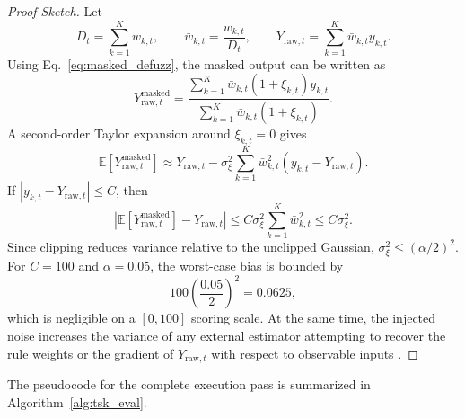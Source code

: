 \documentclass[pdflatex,sn-mathphys-num]{sn-jnl}
\theoremstyle{thmstyleone}
\theoremstyle{thmstyletwo}
\theoremstyle{thmstylethree}
\begin{document}
\begin{proof}[Proof Sketch]
Let
\[
    D_t = \sum_{k=1}^{K} w_{k,t},
    \qquad
    \bar{w}_{k,t} = \frac{w_{k,t}}{D_t},
    \qquad
    Y_{\mathrm{raw},t} = \sum_{k=1}^{K} \bar{w}_{k,t} y_{k,t}.
\]
Using Eq.~\eqref{eq:masked_defuzz}, the masked output can be written as
\[
    Y_{\mathrm{raw},t}^{\text{masked}}
    =
    \frac{
    \sum_{k=1}^{K} \bar{w}_{k,t} (1+\xi_{k,t}) y_{k,t}
    }{
    \sum_{k=1}^{K} \bar{w}_{k,t} (1+\xi_{k,t})
    }.
\]
A second-order Taylor expansion around $\xi_{k,t}=0$ gives
\begin{equation}
    \mathbb{E}\left[
    Y_{\mathrm{raw},t}^{\text{masked}}
    \right]
    \approx
    Y_{\mathrm{raw},t}
    -
    \sigma_{\xi}^2
    \sum_{k=1}^{K}
    \bar{w}_{k,t}^2
    \left(
    y_{k,t} - Y_{\mathrm{raw},t}
    \right).
    \label{eq:bias_expansion}
\end{equation}
If $|y_{k,t} - Y_{\mathrm{raw},t}| \le C$, then
\[
    \left|
    \mathbb{E}\left[
    Y_{\mathrm{raw},t}^{\text{masked}}
    \right]
    -
    Y_{\mathrm{raw},t}
    \right|
    \le
    C \sigma_{\xi}^2
    \sum_{k=1}^{K}
    \bar{w}_{k,t}^2
    \le
    C \sigma_{\xi}^2.
\]
Since clipping reduces variance relative to the unclipped Gaussian, $\sigma_{\xi}^2 \le (\alpha/2)^2$. For $C=100$ and $\alpha=0.05$, the worst-case bias is bounded by
\[
    100 \left(\frac{0.05}{2}\right)^2 = 0.0625,
\]
which is negligible on a $[0,100]$ scoring scale. At the same time, the injected noise increases the variance of any external estimator attempting to recover the rule weights or the gradient of $Y_{\mathrm{raw},t}$ with respect to observable inputs \cite{goodfellow2015,kurakin2017}.
\end{proof}

The pseudocode for the complete execution pass is summarized in Algorithm~\ref{alg:tsk_eval}.
\end{document}
